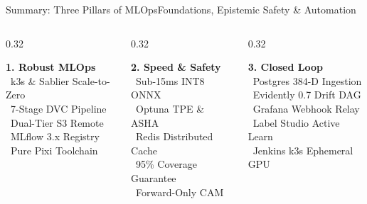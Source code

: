 \documentclass[aspectratio=169,10pt]{beamer}
\begin{document}
\begin{frame}{Summary: Three Pillars of MLOps}{Foundations, Epistemic Safety \& Automation}
    \begin{columns}[T]
        \begin{column}{0.32\textwidth}
            \begin{bluecard}
                \centering
                \textbf{\color{BlueAccent} 1. Robust MLOps}\\[3pt]
                \scriptsize
                \textbullet\ k3s \& Sablier Scale-to-Zero\\
                \textbullet\ 7-Stage DVC Pipeline\\
                \textbullet\ Dual-Tier S3 Remote\\
                \textbullet\ MLflow 3.x Registry\\
                \textbullet\ Pure Pixi Toolchain
            \end{bluecard}
        \end{column}
        \begin{column}{0.32\textwidth}
            \begin{greencard}
                \centering
                \textbf{\color{GreenAccent} 2. Speed \& Safety}\\[3pt]
                \scriptsize
                \textbullet\ Sub-15ms INT8 ONNX\\
                \textbullet\ Optuna TPE \& ASHA\\
                \textbullet\ Redis Distributed Cache\\
                \textbullet\ 95\% Coverage Guarantee\\
                \textbullet\ Forward-Only CAM
            \end{greencard}
        \end{column}
        \begin{column}{0.32\textwidth}
            \begin{purplecard}
                \centering
                \textbf{\color{PurpleAccent} 3. Closed Loop}\\[3pt]
                \scriptsize
                \textbullet\ Postgres 384-D Ingestion\\
                \textbullet\ Evidently 0.7 Drift DAG\\
                \textbullet\ Grafana Webhook Relay\\
                \textbullet\ Label Studio Active Learn\\
                \textbullet\ Jenkins k3s Ephemeral GPU
            \end{purplecard}
        \end{column}
    \end{columns}
    

\end{frame}
\end{document}
